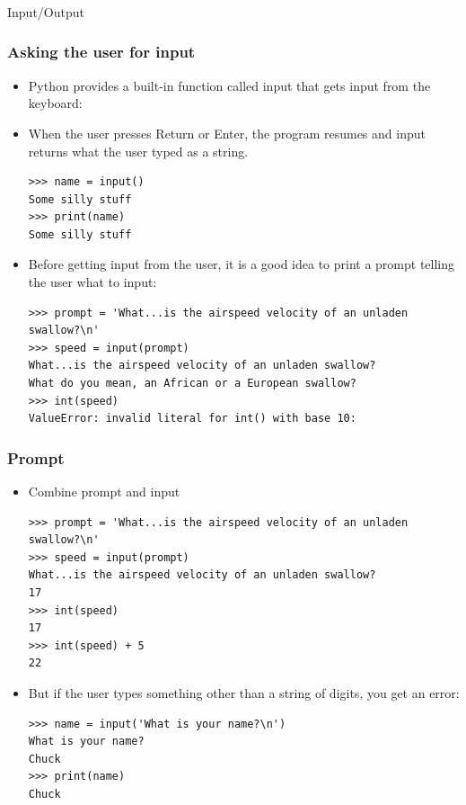 \begin{frame}[fragile]\frametitle{}
\begin{center}
{\Large Input/Output}
\end{center}
\end{frame}


\begin{frame}[fragile]\frametitle{Asking the user for input}
\begin{itemize}
\item  Python provides a built-in function called input that gets input from
the keyboard:
\item When the user presses Return or Enter, the program
resumes and input returns what the user typed as a string.
\begin{lstlisting}
>>> name = input()
Some silly stuff
>>> print(name)
Some silly stuff
\end{lstlisting}
\item Before getting input from the user, it is a good idea to print a prompt telling the
user what to input:
\begin{lstlisting}
>>> prompt = 'What...is the airspeed velocity of an unladen swallow?\n'
>>> speed = input(prompt)
What...is the airspeed velocity of an unladen swallow?
What do you mean, an African or a European swallow?
>>> int(speed)
ValueError: invalid literal for int() with base 10:
\end{lstlisting}
\end{itemize}
\end{frame}

\begin{frame}[fragile]\frametitle{Prompt}
\begin{itemize}
\item  Combine prompt and input
\begin{lstlisting}
>>> prompt = 'What...is the airspeed velocity of an unladen swallow?\n'
>>> speed = input(prompt)
What...is the airspeed velocity of an unladen swallow?
17
>>> int(speed)
17
>>> int(speed) + 5
22
\end{lstlisting}
\item But if the user types something other than a string of digits, you get an error:
\begin{lstlisting}
>>> name = input('What is your name?\n')
What is your name?
Chuck
>>> print(name)
Chuck
\end{lstlisting}
\end{itemize}
\end{frame}

